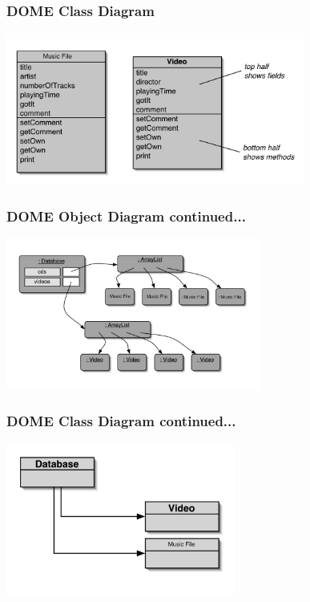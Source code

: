 \documentclass{beamer}
\begin{document}
\begin{frame}
\frametitle{DOME Class Diagram}
\begin{center}
\includegraphics[height=5cm, keepaspectratio]{images/domeclassdiagram}
\end{center}
\end{frame}

\begin{frame}
\frametitle{DOME Object Diagram continued...}
\begin{center}
\includegraphics[height=5cm, keepaspectratio]{images/domeobjectdiagram2}
\end{center}
\end{frame}

\begin{frame}
\frametitle{DOME Class Diagram continued...}
\begin{center}
\includegraphics[height=5cm, keepaspectratio]{images/domeclassdiagram2}
\end{center}
\end{frame}
\end{document}
